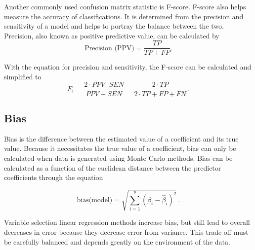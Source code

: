 \documentclass{article}
\begin{document}
Another commonly used confusion matrix statistic is F-score. F-score also helps measure the accuracy of classifications. It is determined from the precision and sensitivity of a model and helps to portray the balance between the two. Precision, also known as positive predictive value, can be calculated by
\begin{equation}
	\text{Precision (PPV)} = \frac{TP}{TP + FP} .
\end{equation}

With the equation for precision and sensitivity, the F-score can be calculated and simplified to
\begin{equation}
	F_1 = \frac{2 \cdot PPV \cdot SEN}{PPV + SEN} = \frac{2 \cdot TP}{2 \cdot TP + FP + FN}\, .
\end{equation}

\subsection{Bias}
Bias is the difference between the estimated value of a coefficient and its true value. Because it necessitates the true value of a coefficient, bias can only be calculated when data is generated using Monte Carlo methods. Bias can be calculated as a function of the euclidean distance between the predictor coefficients through the equation

\begin{equation}
	\text{bias} \text{(model)} = \sqrt{\sum_{i=1}^{p}\left( \beta_i - \hat{\beta}_i \right)^2} \, .
\end{equation}

Variable selection linear regression methods increase bias, but still lead to overall decreases in error because they decrease error from variance. This trade-off must be carefully balanced and depends greatly on the environment of the data.


\newpage


\end{document}
